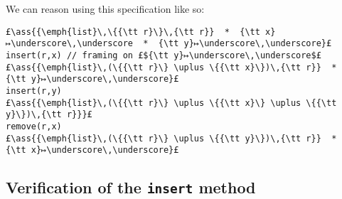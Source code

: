 \documentclass[12pt,a4paper]{article}
\makeatletter
\newcommand{\ml}[2][t]{\mbox{\mdseries\begin{tabular}[#1]{@{}L@{}}#2\end{tabular}}}
\newcommand{\ass}[1]{\ensuremath{{\color{blue}\left\{\ml[c]{#1}\right\}}}}
\makeatother
\begin{document}
\noindent We can reason using this specification like so:

\begin{lstlisting}
£\ass{{\emph{list}\,\{{\tt r}\}\,{\tt r}}  *  {\tt x}↦\underscore\,\underscore  *  {\tt y}↦\underscore\,\underscore}£
insert(r,x) // framing on £${\tt y}↦\underscore\,\underscore$£
£\ass{{\emph{list}\,(\{{\tt r}\} \uplus \{{\tt x}\})\,{\tt r}}  *  {\tt y}↦\underscore\,\underscore}£
insert(r,y)
£\ass{{\emph{list}\,(\{{\tt r}\} \uplus \{{\tt x}\} \uplus \{{\tt y}\})\,{\tt r}}}£
remove(r,x)
£\ass{{\emph{list}\,(\{{\tt r}\} \uplus \{{\tt y}\})\,{\tt r}}  *  {\tt x}↦\underscore\,\underscore}£
\end{lstlisting}



\subsection{Verification of the {\tt insert} method}
\end{document}
